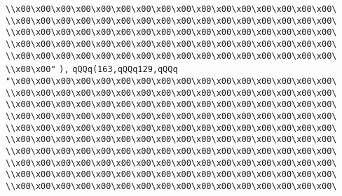 \verb|\\x00\x00\x00\x00\x00\x00\x00\x00\x00\x00\x00\x00\x00\x00\x00\x00\|\newline
\verb|\\x00\x00\x00\x00\x00\x00\x00\x00\x00\x00\x00\x00\x00\x00\x00\x00\|\newline
\verb|\\x00\x00\x00\x00\x00\x00\x00\x00\x00\x00\x00\x00\x00\x00\x00\x00\|\newline
\verb|\\x00\x00\x00\x00\x00\x00\x00\x00\x00\x00\x00\x00\x00\x00\x00\x00\|\newline
\verb|\\x00\x00\x00\x00\x00\x00\x00\x00\x00\x00\x00\x00\x00\x00\x00\x00\|\newline
\verb|\\x00\x00"|\newline
\verb|),|\newline
\verb|qQQq(163,qQQq129,qQQq|\newline
\verb|"\x00\x00\x00\x00\x00\x00\x00\x00\x00\x00\x00\x00\x00\x00\x00\x00\|\newline
\verb|\\x00\x00\x00\x00\x00\x00\x00\x00\x00\x00\x00\x00\x00\x00\x00\x00\|\newline
\verb|\\x00\x00\x00\x00\x00\x00\x00\x00\x00\x00\x00\x00\x00\x00\x00\x00\|\newline
\verb|\\x00\x00\x00\x00\x00\x00\x00\x00\x00\x00\x00\x00\x00\x00\x00\x00\|\newline
\verb|\\x00\x00\x00\x00\x00\x00\x00\x00\x00\x00\x00\x00\x00\x00\x00\x00\|\newline
\verb|\\x00\x00\x00\x00\x00\x00\x00\x00\x00\x00\x00\x00\x00\x00\x00\x00\|\newline
\verb|\\x00\x00\x00\x00\x00\x00\x00\x00\x00\x00\x00\x00\x00\x00\x00\x00\|\newline
\verb|\\x00\x00\x00\x00\x00\x00\x00\x00\x00\x00\x00\x00\x00\x00\x00\x00\|\newline
\verb|\\x00\x00\x00\x00\x00\x00\x00\x00\x00\x00\x00\x00\x00\x00\x00\x00\|\newline
\verb|\\x00\x00\x00\x00\x00\x00\x00\x00\x00\x00\x00\x00\x00\x00\x00\x00\|\newline

